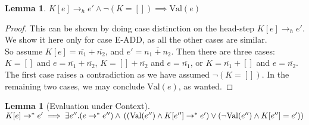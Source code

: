 \documentclass[twoside,11pt,openright]{report}
\newtheorem{lemma}[theorem]{Lemma}
\newcommand{\expr}{e}
\newcommand{\Num}[1]{\overline{#1}}
\newcommand{\empelctx}{[]}
\newcommand{\elctx}{K}
\newcommand{\stepS}{\rightarrow^*}
\newcommand{\hstep}{\rightarrow_h}
\newcommand{\Val}[1]{\mathrm{Val}(#1)}
\begin{document}



\begin{lemma}\label{lem:headstep_val}
  $\elctx[\expr] \hstep \expr' \land \neg (\elctx = \empelctx) \implies \Val{e}$
\end{lemma}

\begin{proof}
  This can be shown by doing case distinction on the head-step $\elctx[\expr] \hstep \expr'$. We show it here only for case E-ADD, as all the other cases are similar. \medskip\\
  So assume $\elctx[\expr] = \Num{n_1} + \Num{n_2}$, and $\expr' = \Num{n_1 + n_2}$.
  Then there are three cases: $\elctx = []$ and $\expr = \Num{n_1} + \Num{n_2}$, $\elctx = [] + \Num{n_2}$ and $\expr = \Num{n_1}$, or $\elctx = \Num{n_1} + []$ and $\expr = \Num{n_2}$. The first case raises a contradiction as we have assumed $\neg (\elctx = \empelctx)$. In the remaining two cases, we may conclude $\Val{\expr}$, as wanted.
\end{proof}


\begin{lemma}[Evaluation under Context]\label{lem:EuC}
  $ \elctx[\expr] \stepS \expr' \implies 
    \exists \expr'' . (\expr \stepS \expr'') \land\\
    \left( (\Val{\expr''} \land \elctx[\expr''] \stepS \expr') \lor
    (\neg \Val{\expr''} \land \elctx[\expr''] = \expr') \right)
    $
\end{lemma}
\end{document}
